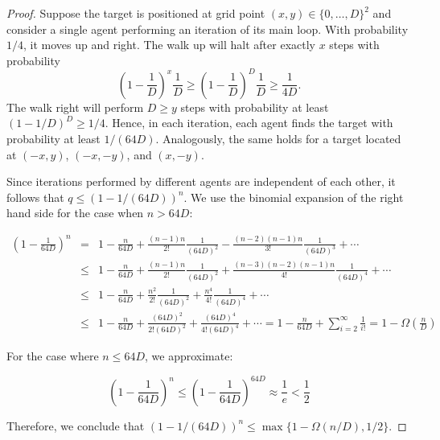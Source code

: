 \documentclass[11pt]{article}
\begin{document}
\begin{proof}
	Suppose the target is positioned at grid point $(x,y)\in \{0,\ldots,D\}^2$ and consider a single agent performing an iteration of its main loop. With probability $1/4$, it moves up and right. The walk up will halt after exactly $x$ steps with probability
\begin{equation*}
\left(1-\frac{1}{D}\right)^x\frac{1}{D}\geq \left(1-\frac{1}{D}\right)^{D}\frac{1}{D} \geq \frac{1}{4D}.
\end{equation*}
The walk right will perform $D \geq y$ steps with probability at least $(1-1/D)^D \geq 1/4$. Hence, in each iteration, each agent finds the target with probability at least $1/(64D)$. Analogously, the same holds for a target located at $(-x,y)$, $(-x,-y)$, and $(x,-y)$. 

Since iterations performed by different agents are independent of each other, it follows that $q \leq (1-1/(64D))^n$. We use the binomial expansion of the right hand side for the case when $n > 64D$:

\begin{eqnarray*}
	\left(1-\frac{1}{64D}\right)^n &=& 1 - \frac{n}{64D} + \frac{(n-1)n}{2!} \frac{1}{(64D)^2} - \frac{(n-2)(n-1)n}{3!} \frac{1}{(64D)^3} + \cdots \\
	& \leq & 1 - \frac{n}{64D} + \frac{(n-1)n}{2!} \frac{1}{(64D)^2} + \frac{(n-3)(n-2)(n-1)n}{4!} \frac{1}{(64D)^4} + \cdots \\
	& \leq & 1 - \frac{n}{64D} + \frac{n^2}{2!} \frac{1}{(64D)^2} + \frac{n^4}{4!} \frac{1}{(64D)^4} + \cdots \\
	& \leq & 1 - \frac{n}{64D} + \frac{(64D)^2}{2!(64D)^2} + \frac{(64D)^4}{4!(64D)^4} + \cdots
	= 1 - \frac{n}{64D} + \sum_{i=2}^{\infty} \frac{1}{i!} = 1 - \Omega\left(\frac{n}{D}\right)
\end{eqnarray*}

For the case where $n \leq 64D$, we approximate:

\begin{equation*}
	\left(1-\frac{1}{64D}\right)^n \leq \left(1-\frac{1}{64D}\right)^{64D} \approx \frac{1}{e} < \frac{1}{2}
\end{equation*}

Therefore, we conclude that $(1-1/(64D))^n \leq \max\{1-\Omega(n/D),1/2\}$.

\end{proof}
\end{document}
